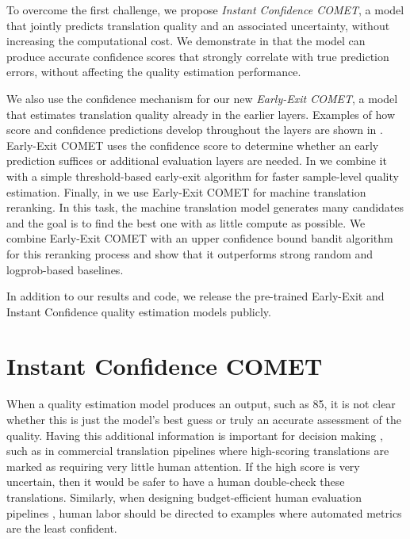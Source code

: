 To overcome the first challenge, we propose \textit{Instant Confidence COMET}, a model that jointly predicts translation quality and an associated uncertainty, without increasing the computational cost.
We demonstrate in  that the model can produce accurate confidence scores that strongly correlate with true prediction errors, without affecting the quality estimation performance.


We also use the confidence mechanism for our new \textit{Early-Exit COMET}, a model that estimates translation quality already in the earlier layers.
Examples of how score and confidence predictions develop throughout the layers are shown in .
Early-Exit COMET uses the confidence score to determine whether an early prediction suffices or additional evaluation layers are needed.
In  we combine it with a simple threshold-based early-exit algorithm for faster sample-level quality estimation.
Finally, in  we use Early-Exit COMET for machine translation reranking.
In this task, the machine translation model generates many candidates and the goal is to find the best one with as little compute as possible.
We combine Early-Exit COMET with an upper confidence bound bandit algorithm for this reranking process and show that it outperforms strong random and logprob-based baselines.



In addition to our results and code, we release the pre-trained Early-Exit and Instant Confidence quality estimation models publicly.


\section{Instant Confidence COMET}
\label{sec:goal_instant_confidence}
When a quality estimation model produces an output, such as 85, it is not clear whether this is just the model's best guess or truly an accurate assessment of the quality.
Having this additional information is important for decision making \citep{zhang2025leveraginguncertaintyestimationefficient,farinhas2025translatesmarthardcascaded}, such as in commercial translation pipelines where high-scoring translations are marked as requiring very little human attention. If the high score is very uncertain, then it would be safer to have a human double-check these translations.
Similarly, when designing budget-efficient human evaluation pipelines \citep{zouhar2025selectdatapointsefficienthuman}, human labor should be directed to examples where automated metrics are the least confident.

